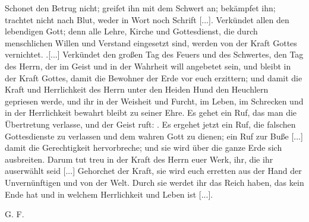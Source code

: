 {    Schonet den Betrug nicht; greifet ihn mit dem Schwert an;
    bekämpfet ihn; trachtet nicht nach Blut, weder in Wort noch
    Schrift [...]. Verkündet allen den lebendigen Gott; denn alle
    Lehre, Kirche und Gottesdienst, die durch menschlichen Willen und
    Verstand eingesetzt sind, werden von der Kraft Gottes vernichtet.
    .[...] Verkündet den großen Tag des Feuers und des Schwertes,
    den Tag des Herrn, der im Geist und in der Wahrheit will
    angebetet sein, und bleibt in der Kraft Gottes, damit die Bewohner
    der Erde vor euch erzittern; und damit die Kraft und Herrlichkeit
    des Herrn unter den Heiden Hund den Heuchlern gepriesen
    werde, und ihr in der Weisheit und Furcht, im Leben, im Schrecken
    und in der Herrlichkeit bewahrt bleibt zu seiner Ehre. Es gehet
    ein Ruf, das man die Übertretung verlasse, und der Geist ruft:
    . Es ergehet jetzt ein Ruf, die falschen 
    Gottesdienste
    zu verlassen und dem wahren Gott zu dienen; ein Ruf zur
    Buße [...] damit die Gerechtigkeit hervorbreche; und sie wird
    über die ganze Erde sich ausbreiten. Darum tut treu in der
    Kraft des Herrn euer Werk, ihr, die ihr auserwählt seid [...]
    Gehorchet der Kraft, sie wird euch erretten aus der Hand der
    Unvernünftigen und von der Welt. Durch sie werdet ihr das
    Reich haben, das kein Ende hat und in welchem Herrlichkeit und
    Leben ist [...]. 

\bigskip

\begin{flushright}G. F.\end{flushright}

}


